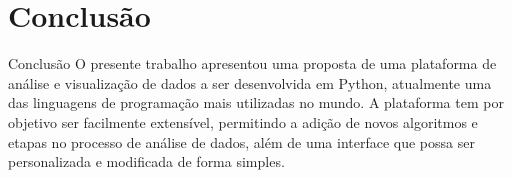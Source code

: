 

\section{Conclusão}
\label{sec:conclusao}

\begin{frame}{Conclusão}
	\quad O presente trabalho apresentou uma proposta de uma plataforma de análise e visualização de dados a ser desenvolvida em Python, atualmente uma das linguagens de programação mais utilizadas no mundo. A plataforma tem por objetivo ser facilmente extensível, permitindo a adição de novos algoritmos e etapas no processo de análise de dados, além de uma interface que possa ser personalizada e modificada de forma simples.
\end{frame}
